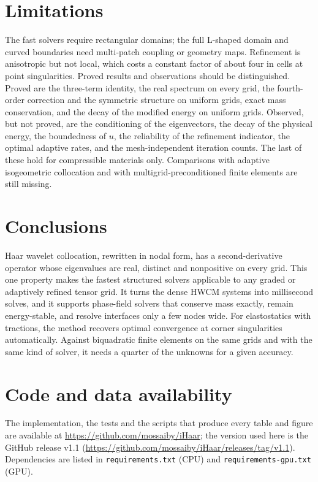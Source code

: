 \documentclass[preprint,12pt]{elsarticle}
\theoremstyle{remark}
\newcommand{\repo}{\url{https://github.com/mossaiby/iHaar}}
\newcommand{\archive}{\url{https://github.com/mossaiby/iHaar/releases/tag/v1.1}}
\begin{document}
\section{Limitations}\label{sec:limits}
The fast solvers require rectangular domains; the full L-shaped domain and curved boundaries need
multi-patch coupling or geometry maps. Refinement is anisotropic but not local, which costs a constant
factor of about four in cells at point singularities. Proved results and observations should be
distinguished. Proved are the three-term identity, the real spectrum on every grid, the fourth-order
correction and the symmetric structure on uniform grids, exact mass conservation, and the decay of the
modified energy on uniform grids. Observed, but not proved, are the conditioning of the eigenvectors, the
decay of the physical energy, the boundedness of $u$, the reliability of the refinement indicator, the
optimal adaptive rates, and the mesh-independent iteration counts. The last of these hold for compressible
materials only. Comparisons with adaptive isogeometric collocation and with multigrid-preconditioned finite
elements are still missing.

\section{Conclusions}
Haar wavelet collocation, rewritten in nodal form, has a second-derivative operator whose eigenvalues are
real, distinct and nonpositive on every grid. This one property makes the fastest structured solvers
applicable to any graded or adaptively refined tensor grid. It turns the dense HWCM systems into
millisecond solves, and it supports phase-field solvers that conserve mass exactly, remain energy-stable,
and resolve interfaces only a few nodes wide. For elastostatics with tractions, the method recovers optimal
convergence at corner singularities automatically. Against biquadratic finite elements on the same grids and with the same kind of solver, it needs a
quarter of the unknowns for a given accuracy.

\section*{Code and data availability}
The implementation, the tests and the scripts that produce every table and figure are available at \repo;
the version used here is the GitHub release v1.1 (\archive).
Dependencies are listed in \texttt{requirements.txt} (CPU) and \texttt{requirements-gpu.txt} (GPU).
\end{document}
